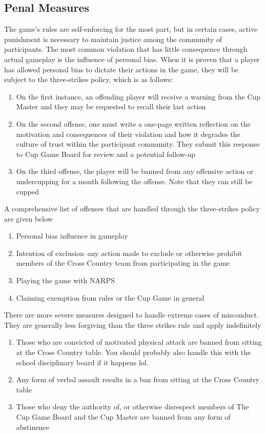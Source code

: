 \documentclass[12pt]{IEEEconf}
\begin{document}
\subsection{Penal Measures}
The game's rules are self-enforcing for the most part, but in certain cases, active punishment is necessary to maintain justice among the community of participants. The most common violation that has little consequence through actual gameplay is the influence of personal bias. When it is proven that a player has allowed personal bias to dictate their actions in the game, they will be subject to the three-strikes policy, which is as follows:
\begin{enumerate}
    \item On the first instance, an offending player will receive a warning from the Cup Master and they may be requested to recall their last action
    \item On the second offense, one must write a one-page written reflection on the motivation and consequences of their violation and how it degrades the culture of trust within the participant community. They submit this response to Cup Game Board for review and a potential follow-up
    \item On the third offense, the player will be banned from any offensive action or undercupping for a month following the offense. Note that they can still be cupped
\end{enumerate}

A comprehensive list of offenses that are handled through the three-strikes policy are given below
\begin{enumerate}
    \item Personal bias influence in gameplay
    \item Intention of exclusion--any action made to exclude or otherwise prohibit members of the Cross Country team from participating in the game
    \item Playing the game with NARPS
    \item Claiming exemption from rules or the Cup Game in general
\end{enumerate}

There are more severe measures designed to handle extreme cases of misconduct. They are generally less forgiving than the three strikes rule and apply indefinitely
\begin{enumerate}
    \item Those who are convicted of motivated physical attack are banned from sitting at the Cross Country table. You should probably also handle this with the school disciplinary board if it happens lol.
    \item Any form of verbal assault results in a ban from sitting at the Cross Country table 
    \item Those who deny the authority of, or otherwise disrespect members of The Cup Game Board and the Cup Master are banned from any form of abstinence
\end{enumerate}
\end{document}
